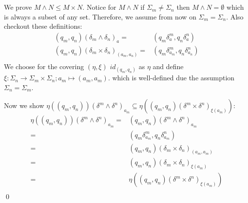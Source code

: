 \documentclass[a4paper,12pt,numbers=noenddot]{scrreport}
\begin{document}

\chapter{}
\section{}
We prove $M \land N \leq M \times N$. Notice for $M \land N$ if $\Sigma_m \neq \Sigma_n$ then $M \land N = \emptyset$ which is always a subset of any set.
Therefore, we assume from now on $\Sigma_m = \Sigma_n$.
Also checkout these definitions:
\begin{align*}
    (q_m, q_n) (\delta_m \land \delta_n)_a = & (q_m \delta^m_a, q_n \delta^n_a)  \label{eq1}\tag{1}\\
    (q_m, q_n) (\delta_m \times \delta_n)_{(a_m, a_n)} = & (q_m \delta^m_{a_m}, q_n \delta^n_{a_n})  \label{eq2}\tag{2}\\
\end{align*}
We choose for the covering $(\eta,\xi)$ $id_{(q_m, q_n)}$ as $\eta$ and define $\xi: \Sigma_n \rightarrow \Sigma_m \times \Sigma_n; a_m \mapsto (a_m, a_m)$.
which is well-defined due the assumption $\Sigma_n = \Sigma_m$.

Now we show $\eta((q_m, q_n)) (\delta^m \land \delta^n)_{a_m} \subseteq \eta((q_m,q_n) (\delta^m \times \delta^n)_{\xi(a_m)})$:
\begin{align*}
    \eta((q_m, q_n)) (\delta^m \land \delta^n)_{a_m} = & (q_m, q_n) (\delta^m \land \delta^n)_{a_m} \tag{def. $\eta$, 1}\\
                               = & (q_m \delta^m_{a_m}, q_n \delta^n_{a_m}) \tag{2}\\
                               = & (q_m, q_n) (\delta_m \times \delta_n)_{(a_m, a_m)} \tag{def. $\xi$}\\
                               = & (q_m, q_n) (\delta_m \times \delta_n)_{\xi(a_m)} \tag{def. $\eta$}\\
                               = & \eta((q_m,q_n) (\delta^m \times \delta^n)_{\xi(a_m)}) \\
\end{align*}
\qed
\end{document}
